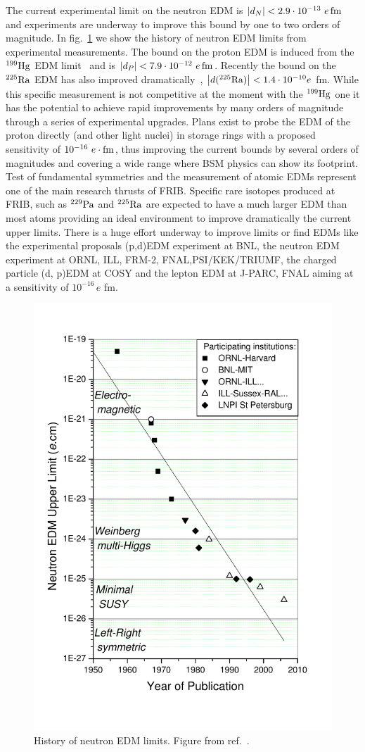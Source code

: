 \documentclass[aps,prc,twocolumn,showpacs,floatfix,nofootinbib,preprintnumbers,superscriptaddress,amsmath,amssymb]{revtex4-1}
\begin{document}
The current experimental limit on the neutron EDM is $|d_N|<2.9 \cdot 10^{-13}~e \,{\rm fm}$~\cite{Baker:2006ts} 
and experiments are underway to improve this bound by one to two orders of magnitude.
In fig.~\ref{fig:dn_history} we show the history of neutron EDM limits from experimental measurements.
The bound on the proton EDM is induced from the $^{199}{\rm Hg}$ EDM limit~\cite{Griffith:2009zz} 
and is $|d_P|<7.9 \cdot 10^{-12}~e\,{\rm fm}$. Recently the bound on the $^{225} {\rm Ra}$ EDM has also improved 
dramatically~\cite{Bishof:2016uqx}, $\left|d(^{225} {\rm Ra})\right| < 1.4 \cdot 10^{-10} e$ fm.
While this specific measurement is not competitive at the moment with the $^{199}{\rm Hg}$ one
it has the potential to achieve rapid improvements by many orders of magnitude through a series of experimental upgrades. 
Plans exist to probe the EDM of the proton directly (and other light nuclei) in storage rings \cite{Pretz:2013us} with a 
proposed sensitivity of $10^{-16}~e \cdot {\rm fm}$, thus improving the current bounds 
by several orders of magnitudes and covering a wide range where BSM physics can show its footprint.
Test of fundamental symmetries and the measurement of atomic EDMs represent one of the main research thrusts 
of FRIB. Specific rare isotopes produced at FRIB, such as $^{229} {\rm Pa}$ and $^{225}{\rm Ra}$ 
are expected to have a much larger EDM than most atoms providing an ideal environment to improve
dramatically the current upper limits.
There is a huge effort underway to improve limits or find EDMs like the experimental proposals
(p,d)EDM experiment at BNL, the neutron EDM experiment at ORNL, ILL, FRM-2,
FNAL,PSI/KEK/TRIUMF, the charged particle (d, p)EDM at COSY
and the lepton EDM at J-PARC, FNAL aiming at a sensitivity of $10^{-16}\,e$ fm.
\begin{figure}
    \includegraphics[width=.45\textwidth]{fig01_edm_limit.pdf}
\vspace{-1.5cm}
  \caption{History of neutron EDM limits. Figure from ref.~\cite{Harris:2007fz}.}
  \label{fig:dn_history}
\end{figure}
\end{document}
